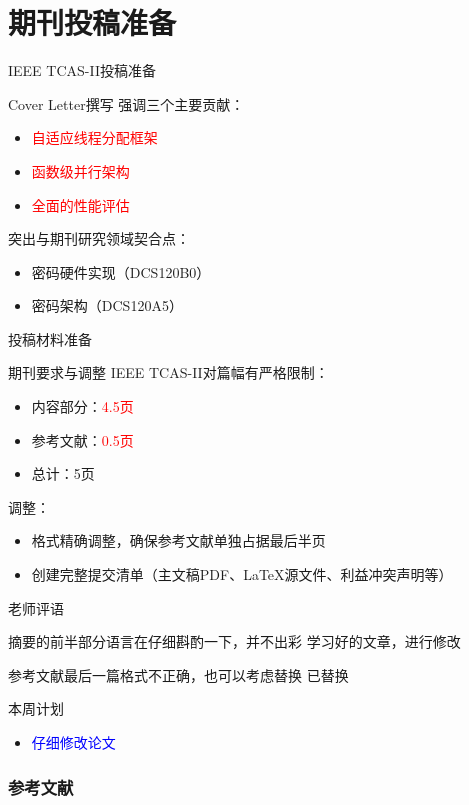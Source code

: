 \documentclass{beamer}
\begin{document}
\section{期刊投稿准备}
\begin{frame}{IEEE TCAS-II投稿准备}
  \begin{block}{Cover Letter撰写}
    强调三个主要贡献：
    \begin{itemize}
      \item \textcolor{red}{自适应线程分配框架}
      \item \textcolor{red}{函数级并行架构}
      \item \textcolor{red}{全面的性能评估}
    \end{itemize}
    突出与期刊研究领域契合点：
    \begin{itemize}
      \item 密码硬件实现（DCS120B0）
      \item 密码架构（DCS120A5）
    \end{itemize}
  \end{block}
\end{frame}

\begin{frame}{投稿材料准备}
  \begin{block}{期刊要求与调整}
    IEEE TCAS-II对篇幅有严格限制：
    \begin{itemize}
      \item 内容部分：\textcolor{red}{4.5页}
      \item 参考文献：\textcolor{red}{0.5页}
      \item 总计：5页
    \end{itemize}
    调整：
    \begin{itemize}
      \item 格式精确调整，确保参考文献单独占据最后半页
      \item 创建完整提交清单（主文稿PDF、LaTeX源文件、利益冲突声明等）
    \end{itemize}
  \end{block}
\end{frame}

\begin{frame}{老师评语}
    \begin{alertblock}{摘要的前半部分语言在仔细斟酌一下，并不出彩}
        学习好的文章，进行修改
    \end{alertblock}
    \begin{alertblock}{参考文献最后一篇格式不正确，也可以考虑替换}
        已替换
    \end{alertblock}
  \begin{block}{本周计划}
    \begin{itemize}
      \item \textcolor{blue}{仔细修改论文}
    \end{itemize}
  \end{block}
\end{frame}

\begin{frame}
  \frametitle{参考文献}
  
  
\end{frame}
\end{document}
